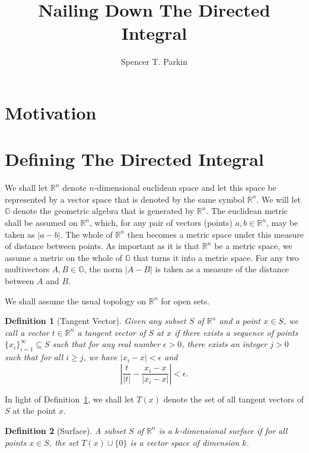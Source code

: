 \documentclass[12pt]{article}
\title{Nailing Down The Directed Integral}
\author{Spencer T. Parkin}
\numberwithin{equation}{section}
\newcommand{\G}{\mathbb{G}}
\newcommand{\R}{\mathbb{R}}
\newtheorem{definition}{Definition}[section]
\begin{document}
\maketitle

\section{Motivation}


\section{Defining The Directed Integral}

We shall let $\R^n$ denote $n$-dimensional euclidean space and let this space be
represented by a vector space that is denoted by the same symbol $\R^n$.
We will let $\G$ denote the geometric algebra that is generated by $\R^n$.
The euclidean metric shall be assumed on $\R^n$,
which, for any pair of vectors (points) $a,b\in\R^n$, may be taken as $|a-b|$.
The whole of $\R^n$ then becomes a metric space under this measure of distance
between points.  As important as it is that $\R^n$ be a metric space, we assume
a metric on the whole of $\G$ that turns it into a metric space.  For any two
multivectors $A,B\in\G$, the norm $|A-B|$ is taken as a measure of the
distance between $A$ and $B$.

We shall assume the usual topology on $\R^n$ for open sets.

\begin{definition}[Tangent Vector]\label{def_tangent_vector}
Given any subset $S$ of $\R^n$ and a point $x\in S$, we call a vector $t\in\R^n$
a tangent vector of $S$ at $x$ if there exists a sequence of points $\{x_i\}_{i=1}^\infty\subseteq S$
such that for any real number $\epsilon>0$, there exists an integer $j>0$ such that
for all $i\geq j$, we have $|x_i-x|<\epsilon$ and
\begin{equation*}
\left|\frac{t}{|t|} - \frac{x_i-x}{|x_i-x|}\right|<\epsilon.
\end{equation*}
\end{definition}

In light of Definition~\ref{def_tangent_vector}, we shall let
$T(x)$ denote the set of all tangent vectors of $S$ at the point $x$.

\begin{definition}[Surface]\label{def_surface}
A subset $S$ of $\R^n$ is a $k$-dimensional surface if for all points $x\in S$, the set
$T(x)\cup\{0\}$ is a vector space of dimension $k$.
\end{definition}
\end{document}
